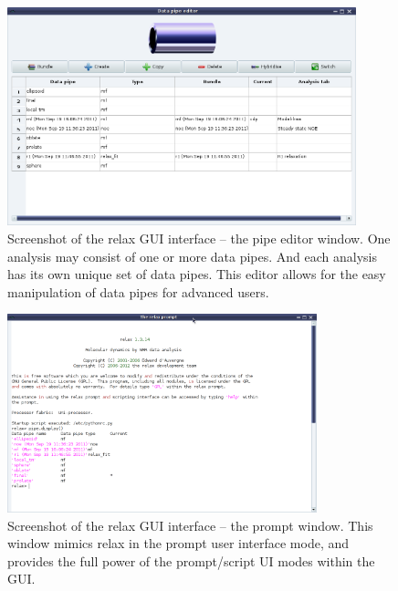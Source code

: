 \begin{figure}
\centerline{\includegraphics[width=0.9\textwidth, bb=14 14 769 488]{graphics/screenshots/pipe_editor}}
\caption[Pipe editor window screenshot]{Screenshot of the relax GUI interface -- the pipe editor window.  One analysis may consist of one or more data pipes.  And each analysis has its own unique set of data pipes.  This editor allows for the easy manipulation of data pipes for advanced users.}\label{fig: screenshot: pipe editor}
\end{figure}

\begin{figure}
\centerline{\includegraphics[width=0.8\textwidth, bb=14 14 769 499]{graphics/screenshots/relax_prompt}}
\caption[Prompt window screenshot]{Screenshot of the relax GUI interface -- the prompt window.  This window mimics relax in the prompt user interface mode, and provides the full power of the prompt/script UI modes within the GUI.}\label{fig: screenshot: prompt window}
\end{figure}


